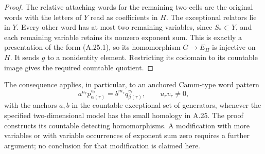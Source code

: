 \begin{proof}
The relative attaching words for the remaining two-cells
are the original words with the letters of $Y$ read as
coefficients in $H$. The exceptional relators lie in
$Y$. Every other word has at most two remaining
variables, since $S_*\subset Y$, and each remaining
variable retains its nonzero exponent sum. This is
exactly a presentation of the form (A.25.1), so its
homomorphism $G\to E_H$ is injective on $H$. It sends
$g$ to a nonidentity element. Restricting its codomain
to its countable image gives the required countable
quotient.
\end{proof}

The consequence applies, in particular, to an anchored Camm-type
word pattern
\[
 a^{n_r}p_{\alpha(r)}^{u_r}
       =b^{m_r}q_{\beta(r)}^{v_r},\qquad u_rv_r\ne0,
\]
with the anchors $a,b$ in the countable exceptional set of
generators, whenever the specified two-dimensional model has
the small homology in A.25. The proof constructs its countable
detecting homomorphisms. A modification with more variables
or with variable occurrences of exponent sum zero requires
a further argument; no conclusion for that modification
is claimed here.

